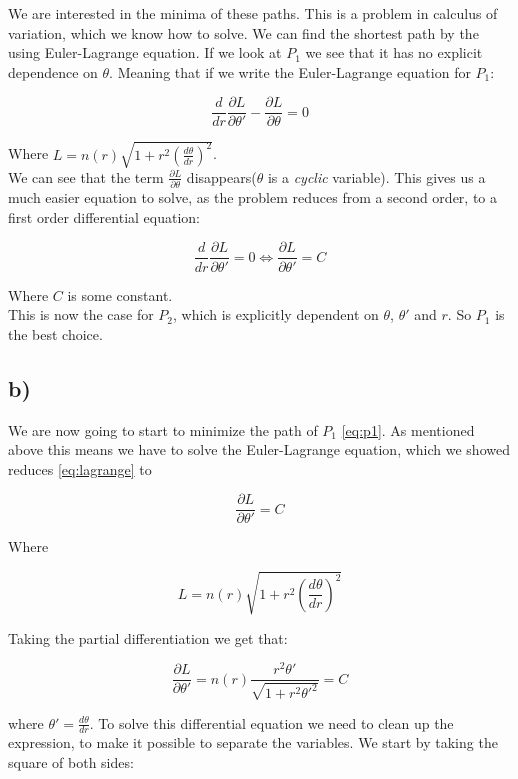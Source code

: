 \documentclass[a4paper,norsk, 10pt]{article}
\begin{document}
We are interested in the minima of these paths. This is a problem in calculus of variation, which we know how to solve. We can find the shortest path by the using Euler-Lagrange equation. If we look at $P_1$ we see that it has no explicit dependence on $\theta$. Meaning that if we write the Euler-Lagrange equation for $P_1$:

$$
\frac{d}{dr}\frac{\partial L}{\partial \theta'} - \frac{\partial L}{\partial \theta} = 0
$$ 

Where $L = n(r)\sqrt{1 + r^2 \left(\frac{d\theta}{dr}\right)^2}$.\\

We can see that the term $\frac{\partial L}{\partial \theta}$ disappears($\theta$ is a \textit{cyclic} variable). This gives us a much easier equation to solve, as the problem reduces from a second order, to a first order differential equation:

\begin{equation}
\frac{d}{dr}\frac{\partial L}{\partial \theta'} = 0 \Leftrightarrow \frac{\partial L}{\partial \theta'} = C
\label{eq:lagrange}
\end{equation}

Where $C$ is some constant.\\

This is now the case for $P_2$, which is explicitly dependent on $\theta$, $\theta'$ and $r$. So $P_1$ is the best choice.


\subsection*{b)}

We are now going to start to minimize the path of $P_1$ \ref{eq:p1}. As mentioned above this means we have to solve the Euler-Lagrange equation, which we showed reduces \ref{eq:lagrange} to

$$
\frac{\partial L}{\partial \theta'} = C
$$

Where

$$
L = n(r)\sqrt{1 + r^2 \left(\frac{d\theta}{dr}\right)^2}
$$

Taking the partial differentiation we get that:

$$
\frac{\partial L}{\partial \theta'} = n(r) \frac{r^2\theta'}{\sqrt{1 + r^2\theta'^2}} = C
$$

where $\theta' = \frac{d\theta}{dr}$. To solve this differential equation we need to clean up the expression, to make it possible to separate the variables. We start by taking the square of both sides:
\end{document}
